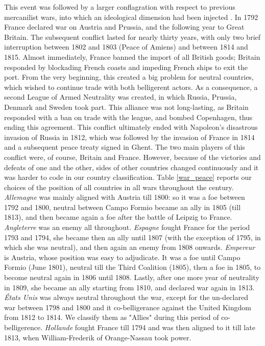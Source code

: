 \documentclass[12pt,a4paper,notitlepage,english]{article}
\begin{document}
\begin{appendix}
This event was followed by a larger conflagration with respect to previous mercanilist wars, into which an ideological dimension had been injected \citep{ORourke2006}.
In 1792 France declared war on Austria and Prussia, and the following year to Great Britain.
The subsequent conflict lasted for nearly thirty years, with only two brief interruption between 1802 and 1803 (Peace of Amiens) and between 1814 and 1815.
Almost immediately, France banned the import of all British goods; Britain responded by blockading French coasts and impeding French ships to exit the port.
From the very beginning, this created a big problem for neutral countries, which wished to continue trade with both belligerent actors.
As a consequence, a second League of Armed Neutrality was created, in which Russia, Prussia, Denmark and Sweden took part.
This alliance was not long-lasting, as Britain responded with a ban on trade with the league, and bombed Copenhagen, thus ending this agreement.
This conflict ultimately ended with Napoleon's disastrous invasion of Russia in 1812, which was followed by the invasion of France in 1814 and a subsequent peace treaty signed in Ghent.
The two main players of this conflict were, of course, Britain and France.
However, because of the victories and defeats of one and the other, sides of other countries changed continuously and it was harder to code in our country classification. Table \ref{war_peace} reports our choices of the position of all countries in all wars throughout the century. 
\textit{Allemagne} was mainly aligned with Austria till 1800: so it was a foe between 1792 and 1800, neutral between Campo Formio became an ally in 1805 (till 1813), and then became again a foe after the battle of Leipzig to France.
\textit{Angleterre} was an enemy all throughout.
\textit{Espagne} fought France for the period 1793 and 1794, she became then an ally until 1807 (with the exception of 1795, in which she was neutral), and then again an enemy from 1808 onwards.
\textit{Empereur} is Austria, whose position was easy to adjudicate. It was a foe until Campo Formio (June 1801), neutral till the Third Coalition (1805), then a foe in 1805, to become neutral again in 1806 until 1808.
Lastly, after one more year of neutrality in 1809, she became an ally starting from 1810, and declared war again in 1813.
\textit{États Unis} was always neutral throughout the war, except for the un-declared war between 1798 and 1800 and it co-belligerance against the United Kingdom from 1812 to 1814.
We classify them as "Allies" during this period of co-belligerence.
\textit{Hollande} fought France till 1794 and was then aligned to it till late 1813, when William-Frederik of Orange-Nassau took power.

\end{appendix}
\end{document}
